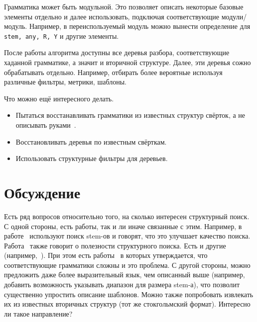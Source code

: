 \documentclass[a5paper]{article}
\begin{document}
Грамматика может быть модульной. Это позволяет описать некоторые базовые элементы отдельно и далее 
использовать, подключая соответствующие модули/модуль. Например, в переиспользуемый модуль можно 
вынести определение для \texttt{stem, any, R, Y} и другие элементы.

После работы алгоритма доступны все деревья разбора, соответствующие хаданной грамматике, а значит 
и вторичной структуре. Далее, эти деревья сожно обрабатывать отдельно. Например, отбирать более 
вероятные используя различные фильтры, метрики, шаблоны. 

Что можно ещё интересного делать.
\begin{itemize} 
\item Пытаться восстанавливать грамматики из известных структур свёрток, а не описывать руками~\cite{SCFGRNA1}.
\item Восстановливать деревья по известным свёрткам.
\item Использовать структурные фильтры для деревьев.
\end{itemize}

\section{Обсуждение}

Есть ряд вопросов относительно того, на сколько интересен структурный поиск. С одной стороны, есть работы, так и ли иначе связанные с этим. Например, в работе~\cite{STEMSEARCH1} используют поиск stem-ов и говорят, что это улучшает качество поиска.
Работа~\cite{STEMSEARCH2} также говорит о полезности структурного поиска. Есть и другие (например,~\cite{SCFGRNA2}). При этом есть работы~\cite{SCFGRNA1,SCFGHARD1} в которых утверждается,
 что соответствующие грамматики сложны и это проблема. С другой стороны, можно предложить даже более выразительный язык, чем описанный выше (например, добавить возможность указывать диапазон для размера stem-а),
 что позволит существенно упростить описание шаблонов. Можно также попробовать извлекать их из известных вторичных структур (тот же стокгольмский формат). Интересно ли такое направление? 
\end{document}
